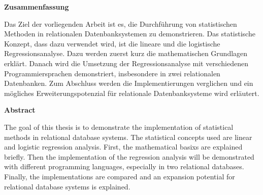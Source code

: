 

\clearemptydoublepage
{}
{}





\vspace*{2cm}
\begin{center}
{\Large \bf Zusammenfassung}
\end{center}
\vspace{1cm}

Das Ziel der vorliegenden Arbeit ist es, die Durchführung von statistischen Methoden in relationalen Datenbanksystemen zu demonstrieren. Das statistische Konzept, dass dazu verwendet wird, ist die lineare und die logistische Regressionsanalyse. Dazu werden zuerst kurz die mathematischen Grundlagen erklärt. Danach wird die Umsetzung der Regressionsanalyse mit verschiedenen Programmiersprachen demonstriert, insbesondere in zwei relationalen Datenbanken. Zum Abschluss werden die Implementierungen verglichen und ein mögliches Erweiterungspotenzial für relationale Datenbanksysteme wird erläutert.

\vspace*{3cm}
\begin{center}
{\Large \bf Abstract}
\end{center}
\vspace{1cm}

The goal of this thesis is to demonstrate the implementation of statistical methods in relational database systems. The statistical concepts used are linear and logistic regression analysis. First, the mathematical basixs are explained briefly. Then the implementation of the regression analysis will be demonstrated with different programming languages, especially in two relational databases. Finally, the implementations are compared and an expansion potential for relational database systems is explained.
